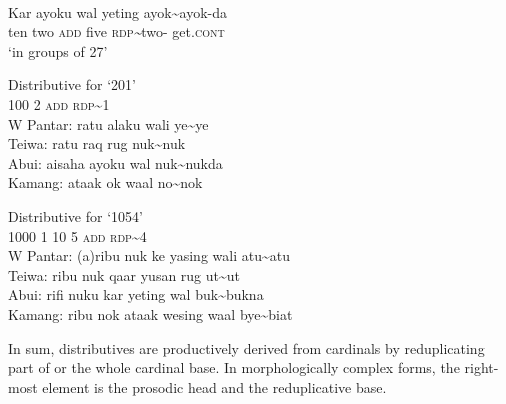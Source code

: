\ea%
\label{bkm:Ref342661452}
\\
\gll Kar   ayoku   wal   yeting   ayok\~{}ayok-da\\  
   ten   two   \textsc{add}   five   \textsc{rdp}\textit{\~{}}two-\textsc{} get.\textsc{cont} \\
\glt  `in groups of 27' 
\z
 



\let\eachwordone=\rm
\let\eachwordtwo=\it 
\let\eachwordthree=\it 
\let\eachwordfour=\it 
\let\eachwordfive=\it 

\ea%
\label{bkm:Ref342656299} 
 Distributive for `201' \\
\glllll  {} 100    2    \textsc{add}    \textsc{rdp}\~{}1\\  
 {W Pantar:} ratu    alaku    wali     ye\~{}ye        \\
 Teiwa:    ratu    raq    rug    nuk\~{}nuk      \\
 Abui:     aisaha     ayoku    wal    nuk\~{}nukda      \\
 Kamang:   ataak     ok     waal    no\~{}nok     \\  
\z

\ea%
\label{bkm:Ref342744393}
 
 Distributive for `1054'\\
\glllll   {}   1000    1  10  5    \textsc{add}  \textsc{rdp}\~{}4 \\      
   {W Pantar:}  (a)ribu   nuk   ke  yasing     wali  atu\~{}atu    \\
   Teiwa:    ribu     nuk  qaar  yusan    rug  ut\~{}ut    \\
   Abui:     rifi    nuku  kar  yeting    wal  buk\~{}bukna      \\
   Kamang:   ribu    nok  ataak  wesing    waal  bye\~{}biat     \\
\z


\let\eachwordone=\it
\let\eachwordtwo=\rm 
\let\eachwordthree=\rm 
\let\eachwordfour=\rm 
\let\eachwordfive=\rm 
    

In sum, distributives are productively derived from cardinals by reduplicating part of or the whole cardinal base. In morphologically complex forms, the right-most element is the prosodic head and the reduplicative base. 

